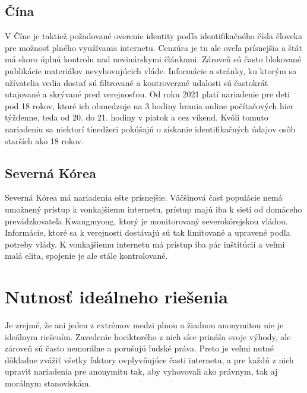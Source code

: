 \documentclass{article}
\begin{document}
\subsection{Čína}

V Číne  je taktiež požadované overenie identity podľa identifikačného čísla človeka pre možnosť plného využívania internetu. Cenzúra  je tu ale oveľa prísnejšia a štát má skoro úplnú kontrolu nad novinárskymi článkami. Zároveň sú často blokované publikácie materiálov nevyhovujúcich vláde. Informácie a stránky, ku ktorým sa užívatelia vedia dostať sú filtrované a  kontroverzné udalosti sú častokrát utajované a skrývané pred verejnosťou. Od roku 2021 platí nariadenie pre deti pod 18 rokov, ktoré ich obmedzuje na 3 hodiny hrania online počítačových hier týždenne, teda od 20. do 21. hodiny v piatok a cez víkend. Kvôli tomuto nariadeniu sa niektorí tínedžeri pokúšajú o získanie identifikačných údajov osôb starších ako 18 rokov.~\cite{wiki-china, china-game-limit}\\

\subsection{Severná Kórea}

Severná Kórea  má nariadenia ešte prísnejšie. Väčšinová časť populácie nemá umožnený prístup k vonkajšiemu internetu, prístup majú iba k sieti od domáceho prevádzkovateľa Kwangmyong, ktorý je monitorovaný severokórejskou vládou. Informácie, ktoré sa k verejnosti dostávajú sú tak limitované a upravené podľa potreby vlády.  K vonkajšiemu internetu  má prístup iba pár inštitúcií a veľmi malá elita, spojenie je ale stále kontrolované.~\cite{wiki-nk-i, wiki-nk-c}\\

\section{Nutnosť ideálneho riešenia}

Je zrejmé, že ani jeden z extrémov medzi plnou a žiadnou anonymitou nie je ideálnym riešením. Zavedenie hociktorého z nich síce prináša svoje výhody, ale zároveň sú často nemorálne a porušujú ľudské práva. Preto je veľmi nutné dôkladne zvážiť všetky faktory ovplyvňujúce časti internetu, a pre každú z nich upraviť nariadenia pre anonymitu tak, aby vyhovovali ako právnym, tak aj morálnym stanoviskám.\\
\end{document}
